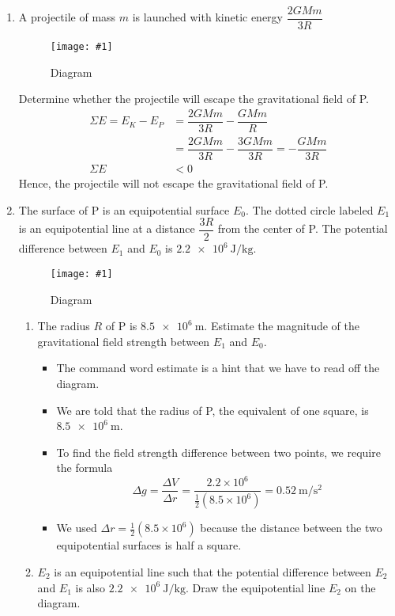 \documentclass[a4paper,12pt]{article}
\newcommand{\img}[4]{\begin{center}
  \begin{figure}[H]
    \centering
    \texttt{[image: \#1]}
    \caption{#3}
    \label{fig:#4}
  \end{figure}
\end{center}}
\begin{document}
\begin{enumerate}[label=(\alph*)]
  \item A projectile of mass $m$ is launched with kinetic energy $\dfrac{2GMm}{3R}$
        \img{ex/4.png}{0.8}{Diagram}{ex4}
        Determine whether the projectile will escape the gravitational field of P.
        \begin{align*}
          \Sigma E = E_K - E_P & = \dfrac{2GMm}{3R} - \dfrac{GMm}{R}                      \\
                               & = \dfrac{2GMm}{3R} - \dfrac{3GMm}{3R} = -\dfrac{GMm}{3R} \\
          \Sigma E             & < 0
        \end{align*}
        Hence, the projectile will not escape the gravitational field of P.
  \item The surface of P is an equipotential surface $E_0$. The dotted circle labeled $E_1$ is an equipotential line at a distance $\dfrac{3R}{2}$ from the center of P. The potential difference between $E_1$ and $E_0$ is $\SI{2.2e6}{\joule\per\kilo\g}$.
        \img{ex/5.png}{0.6}{Diagram}{ex5}
        \begin{enumerate}[label=(\roman*)]
          \item The radius $R$ of P is $\SI{8.5e6}{\meter}$. Estimate the magnitude of the gravitational field strength between $E_1$ and $E_0$.
                \begin{itemize}
                  \item The command word estimate is a hint that we have to read off the diagram.
                  \item We are told that the radius of P, the equivalent of one square, is $\SI{8.5e6}{\meter}$.
                  \item To find the field strength difference between two points, we require the formula $$\Delta g = \frac{\Delta V}{\Delta r} = \frac{2.2\times 10^6}{\frac{1}{2}(8.5\times 10^6)} = \SI{0.52}{\meter\per\second\squared}$$
                  \item We used $\Delta r = \frac{1}{2}(8.5\times 10^6)$ because the distance between the two equipotential surfaces is half a square.
                \end{itemize}
          \item $E_2$ is an equipotential line such that the potential difference between $E_2$ and $E_1$ is also $\SI{2.2e6}{\joule\per\kilo\g}$. Draw the equipotential line $E_2$ on the diagram.
                \begin{itemize}

\end{itemize}
\end{enumerate}
\end{enumerate}
\end{document}
